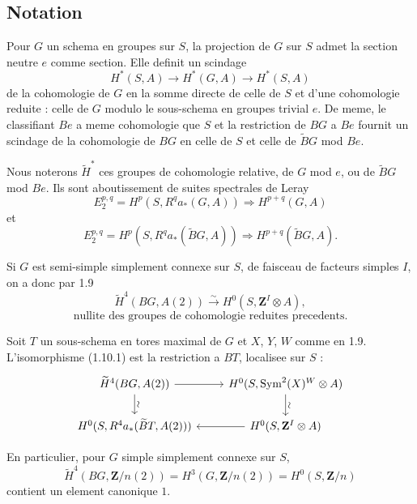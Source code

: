 \documentclass[11pt,a4paper]{article}
\theoremstyle{plain}
\theoremstyle{definition}
\DeclareMathOperator{\Sym}{Sym}
\begin{document}
\subsection{Notation}\label{1.10}

Pour $G$ un schema en groupes sur $S$, la projection de $G$ sur $S$ admet la section neutre $e$ comme section. Elle definit un scindage
\[
H^*(S, A) \to H^*(G, A) \to H^*(S, A)
\]
de la cohomologie de $G$ en la somme directe de celle de $S$ et d'une cohomologie reduite : celle de $G$ modulo le sous-schema en groupes trivial $e$. De meme, le classifiant $Be$ a meme cohomologie que $S$ et la restriction de $BG$ a $Be$ fournit un scindage de la cohomologie de $BG$ en celle de $S$ et celle de $\widetilde{B}G$ mod $Be$.

Nous noterons $\widetilde{H}^*$ ces groupes de cohomologie relative, de $G$ mod $e$, ou de $\widetilde{B}G$ mod $Be$. Ils sont aboutissement de suites spectrales de Leray
\[
E_2^{p,q} = H^p(S, R^q a_*(G, A)) \Rightarrow H^{p+q}(G, A)
\]
et
\[
E_2^{p,q} = H^p(S, R^q a_*(\widetilde{B}G, A)) \Rightarrow H^{p+q}(\widetilde{B}G, A).
\]

Si $G$ est semi-simple simplement connexe sur $S$, de faisceau de facteurs simples $I$, on a donc par 1.9
\begin{equation}\label{1.10.1}
\widetilde{H}^4(BG, A(2)) \xrightarrow{\sim} H^0(S, \mathbf{Z}^I \otimes A),
\end{equation}
\begin{equation}\label{1.10.2}
\text{nullite des groupes de cohomologie reduites precedents.}
\end{equation}

Soit $T$ un sous-schema en tores maximal de $G$ et $X$, $Y$, $W$ comme en 1.9. L'isomorphisme (1.10.1) est la restriction a $BT$, localisee sur $S$ :
\begin{equation}\label{1.10.3}
\begin{tikzcd}
\widetilde{H}^4(BG, A(2)) \arrow{r} \arrow{d}{\rotatebox{90}{$\sim$}} & H^0(S, \Sym^2(X)^W \otimes A) \arrow{d}{\rotatebox{90}{$\sim$}} \\
H^0(S, R^4 a_*(\widetilde{B}T, A(2))) & H^0(S, \mathbf{Z}^I \otimes A) \arrow{l}
\end{tikzcd}
\end{equation}

En particulier, pour $G$ simple simplement connexe sur $S$,
\begin{equation}\label{1.10.4}
\widetilde{H}^4(BG, \mathbf{Z}/n(2)) = H^3(G, \mathbf{Z}/n(2)) = H^0(S, \mathbf{Z}/n)
\end{equation}
contient un element canonique $1$.
\end{document}

